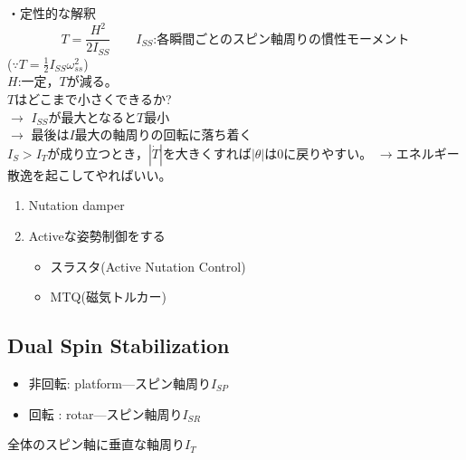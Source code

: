 \documentclass[class=article, crop=false, dvipdfmx]{standalone}
\begin{document}
\begin{center}

\end{center}


\noindent
・定性的な解釈\\
\[ T=\frac{H^2}{2I_{SS}} \qquad I_{SS}\text{:各瞬間ごとのスピン軸周りの慣性モーメント} \]
($\because T=\frac{1}{2}I_{SS}\omega_{ss}^2$)\\
$H$:一定，$T$が減る。\\
\qquad $T$はどこまで小さくできるか?\\
$\rightarrow$ $I_{SS}$が最大となると$T$最小\\
$\rightarrow$ 最後は$I$最大の軸周りの回転に落ち着く\\
$I_S>I_T$が成り立つとき，$|\dot{T}|$を大きくすれば$|\theta|$は0に戻りやすい。
$\rightarrow$エネルギー散逸を起こしてやればいい。
\begin{enumerate}
\item Nutation damper
\begin{center}

\end{center}

\item Activeな姿勢制御をする
\begin{itemize}
\item スラスタ(Active Nutation Control)
\item MTQ(磁気トルカー)
\end{itemize}
\end{enumerate}



\subsection{Dual Spin Stabilization}
\begin{itemize}
\item 非回転: platform---スピン軸周り$I_{SP}$
\item 回転 : rotar---スピン軸周り$I_{SR}$
\end{itemize}

全体のスピン軸に垂直な軸周り$I_T$


\end{document}
